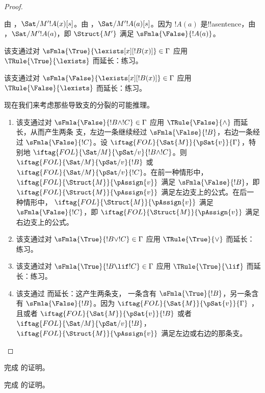 \documentclass[../../../include/open-logic-section]{subfiles}
\begin{document}
\begin{proof}
\begin{enumerate}
{  由 ，$\Sat/{M'}{!A(x)}[s]$。由
  ，$\Sat/{M'}{!A(a)}[s]$。因为
  $!A(a)$ 是!!a{sentence}，由
  ，$\Sat/{M'}{!A(a)}$，即
  $\Struct{M'}$ 满足 $\sFmla{\False}{!A(a)}$。
\item 该支通过对 $\sFmla{\True}{\lexists[x][!B(x)]} \in \Gamma$ 应用 $\TRule{\True}{\lexists}$ 而延长：练习。
\item 该支通过对 $\sFmla{\False}{\lexists[x][!B(x)]} \in \Gamma$ 应用 $\TRule{\False}{\lexists}$ 而延长：练习。}{}
\end{enumerate}
现在我们来考虑那些导致支的分裂的可能推理。
\begin{enumerate}
\item 该支通过对 $\sFmla{\False}{!B \land !C} \in \Gamma$ 应用 $\TRule{\False}{\land}$ 而延长，从而产生两条
  支，左边一条继续经过 $\sFmla{\False}{!B}$，右边一条经过 $\sFmla{\False}{!C}$。设
  $\iftag{FOL}{\Sat{M}}{\pSat{v}}{\Gamma}$，特别地
  $\iftag{FOL}{\Sat/{M}}{\pSat/{v}}{!B \land !C}$。则
  $\iftag{FOL}{\Sat/{M}}{\pSat/{v}}{!B}$ 或
  $\iftag{FOL}{\Sat/{M}}{\pSat/{v}}{!C}$。在前一种情形中，
  $\iftag{FOL}{\Struct{M}}{\pAssign{v}}$ 满足
  $\sFmla{\False}{!B}$，即 $\iftag{FOL}{\Struct{M}}{\pAssign{v}}$
  满足左边支上的公式。在后一种情形中，
  $\iftag{FOL}{\Struct{M}}{\pAssign{v}}$ 满足
  $\sFmla{\False}{!C}$，即 $\iftag{FOL}{\Struct{M}}{\pAssign{v}}$
  满足右边支上的公式。
\item 该支通过对 $\sFmla{\True}{!B \lor !C} \in \Gamma$ 应用 $\TRule{\True}{\lor}$ 而延长：练习。
\item 该支通过对 $\sFmla{\True}{!B \lif !C} \in \Gamma$ 应用 $\TRule{\True}{\lif}$ 而延长：练习。
\item 该支通过 \Cut 而延长：这产生两条支，
  一条含有 $\sFmla{\True}{!B}$，另一条含有
  $\sFmla{\False}{!B}$。因为 $\iftag{FOL}{\Sat{M}}{\pSat{v}}{\Gamma}$
  ，且或者 $\iftag{FOL}{\Sat{M}}{\pSat{v}}{!B}$ 或者
  $\iftag{FOL}{\Sat/{M}}{\pSat/{v}}{!B}$，
  $\iftag{FOL}{\Struct{M}}{\pAssign{v}}$ 满足左边或右边的那条支。
\end{enumerate}
\end{proof}

\begin{prob}
完成  的证明。
\end{prob}
\tagendprob

\begin{prob}
完成  的证明。
\end{prob}
\tagendprob
\end{document}
